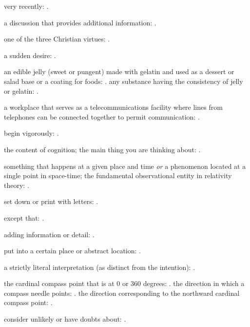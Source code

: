   very recently:   .

  a discussion that provides additional information:   .

  one of the three Christian virtues: .

  a sudden desire:   .

  an edible jelly (sweet or pungent) made with gelatin and used as a dessert or salad base or a coating for foods:   . any substance having the consistency of jelly or gelatin: .

  a workplace that serves as a telecommunications facility where lines from telephones can be connected together to permit communication:   .

  begin vigorously: .

  the content of cognition; the main thing you are thinking about:   .

  something that happens at a given place and time \textit{or} a phenomenon located at a single point in space-time; the fundamental observational entity in relativity theory: .

  set down or print with letters: .

  except that: .

  adding information or detail:   .

  put into a certain place or abstract location:   .

  a strictly literal interpretation (as distinct from the intention): .

  the cardinal compass point that is at 0 or 360 degrees:   . the direction in which a compass needle points:   . the direction corresponding to the northward cardinal compass point: .

  consider unlikely or have doubts about: .

